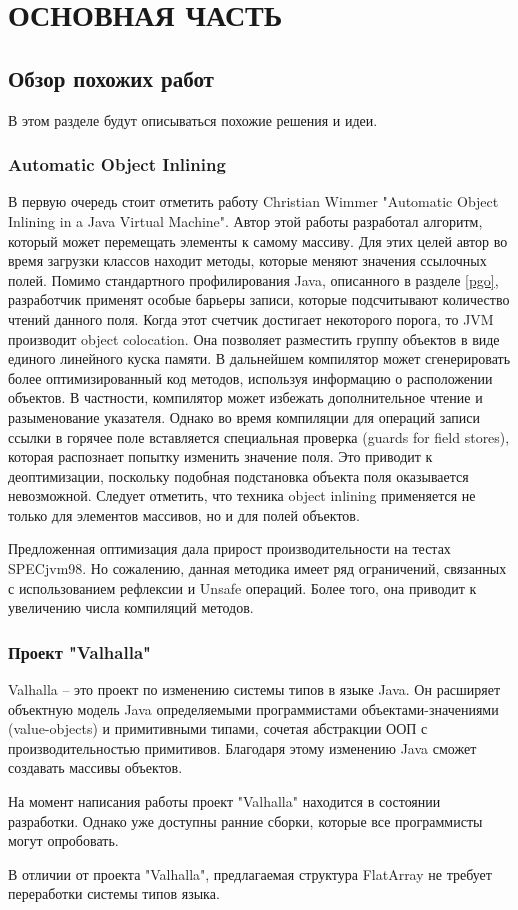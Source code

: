 \section{ОСНОВНАЯ ЧАСТЬ}
\subsection{Обзор похожих работ}
В этом разделе будут описываться похожие решения и идеи.
\subsubsection{Automatic Object Inlining} 
В первую очередь стоит отметить работу Christian Wimmer "Automatic Object Inlining in a Java Virtual Machine"\cite{wimmer-field-inlining}.
Автор этой работы разработал алгоритм, который может перемещать элементы к самому массиву.
Для этих целей автор во время загрузки классов находит методы, которые меняют значения ссылочных полей. 
Помимо стандартного профилирования Java, описанного в разделе \ref{pgo}, разработчик применят особые барьеры записи, которые подсчитывают количество чтений данного поля. Когда этот счетчик достигает некоторого порога, то JVM производит object colocation. 
Она позволяет разместить группу объектов в виде единого линейного куска памяти. 
В дальнейшем компилятор может сгенерировать более оптимизированный код методов, используя информацию о расположении объектов. В частности, компилятор может избежать дополнительное чтение и разыменование указателя. 
Однако во время компиляции для операций записи ссылки в горячее поле вставляется специальная проверка (guards for field stores), которая распознает попытку изменить значение поля. 
Это приводит к деоптимизации, поскольку подобная подстановка объекта поля оказывается невозможной. Следует отметить, что техника object inlining применяется не только для элементов массивов, но и для полей объектов.
\par
Предложенная оптимизация дала прирост производительности на тестах SPECjvm98\cite{spec98}. 
Но сожалению, данная методика имеет ряд ограничений, связанных с использованием рефлексии и Unsafe операций. Более того, она приводит к увеличению числа компиляций методов.
\subsubsection{Проект "Valhalla"}
Valhalla -- это проект по изменению системы типов в языке Java\cite{valhalla}. Он расширяет объектную модель Java определяемыми программистами объектами-значениями (value-objects) и примитивными типами, сочетая абстракции ООП с производительностью примитивов. Благодаря этому изменению Java сможет создавать массивы объектов\cite{valhalla-value-object}.
\par
На момент написания работы проект "Valhalla" находится в состоянии разработки. Однако уже доступны ранние сборки, которые все программисты могут опробовать.
\par
В отличии от проекта "Valhalla", предлагаемая структура FlatArray не требует переработки системы типов языка.

